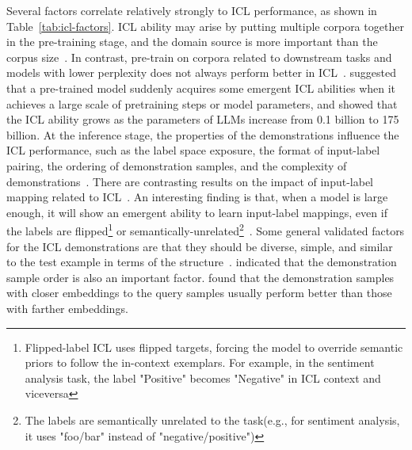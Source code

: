 Several factors correlate relatively strongly to ICL performance, as shown in Table~\ref{tab:icl-factors}.
ICL ability may arise by putting multiple corpora together in the pre-training stage, and the domain source is more important than the corpus size~\cite{shin2022effect}. In contrast, pre-train on corpora related to downstream tasks and models with lower perplexity does not always perform better in ICL~\cite{shin2022effect}.
\textcite{wei2022emergent} suggested that a pre-trained model suddenly acquires some emergent ICL abilities when it achieves a large scale of pretraining steps or model parameters, and \textcite{brown2020language} showed that the ICL ability grows as the parameters of LLMs increase from 0.1 billion to 175 billion.
At the inference stage, the properties of the demonstrations influence the ICL performance, such as the label space exposure, the format of input-label pairing, the ordering of demonstration samples, and the complexity of demonstrations~\cite{min2022rethinking, an2023how, lu2022fantastically}.
There are contrasting results on the impact of input-label mapping related to ICL~\cite{min2022rethinking, yoo2022groundtruth}.
An interesting finding is that, when a model is large enough, it will show an emergent ability to learn input-label mappings, even if the labels are flipped\footnote{Flipped-label ICL uses flipped targets, forcing the model to override semantic priors to follow the in-context exemplars. For example, in the sentiment analysis task, the label "Positive" becomes "Negative" in ICL context and viceversa} or semantically-unrelated\footnote{The labels are semantically unrelated to the task(e.g., for sentiment analysis, it uses "foo/bar" instead of "negative/positive")}~\cite{wei2023larger}.
Some general validated factors for the ICL demonstrations are that they should be diverse, simple, and similar to the test example in terms of the structure~\cite{an2023how}.
\textcite{lu2022fantastically} indicated that the demonstration sample order is also an important factor.
\textcite{liu2022good} found that the demonstration samples with closer embeddings to the query samples usually perform better than those with farther embeddings.


